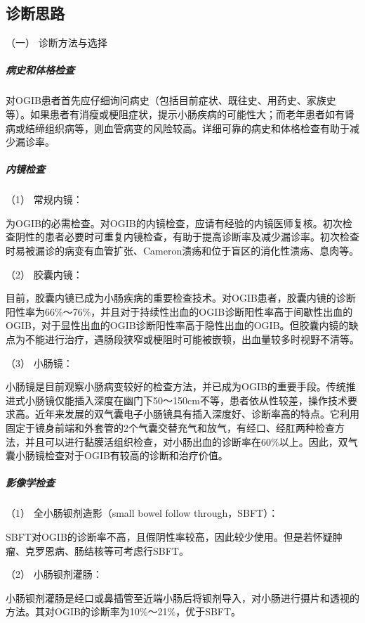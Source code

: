 \subsection{诊断思路}

\hypertarget{text00034.htmlux5cux23CHP1-13-3-1-1}{}
（一） 诊断方法与选择

\subparagraph{病史和体格检查}

对OGIB患者首先应仔细询问病史（包括目前症状、既往史、用药史、家族史等）。如果患者有消瘦或梗阻症状，提示小肠疾病的可能性大；而老年患者如有肾病或结缔组织病等，则血管病变的风险较高。详细可靠的病史和体格检查有助于减少漏诊率。

\subparagraph{内镜检查}

\hypertarget{text00034.htmlux5cux23CHP1-13-3-1-1-2-1}{}
（1） 常规内镜：

为OGIB的必需检查。对OGIB的内镜检查，应请有经验的内镜医师复核。初次检查阴性的患者必要时可重复内镜检查，有助于提高诊断率及减少漏诊率。初次检查时易被漏诊的病变有血管扩张、Cameron溃疡和位于盲区的消化性溃疡、息肉等。

\hypertarget{text00034.htmlux5cux23CHP1-13-3-1-1-2-2}{}
（2） 胶囊内镜：

目前，胶囊内镜已成为小肠疾病的重要检查技术。对OGIB患者，胶囊内镜的诊断阳性率为66\%～76\%，并且对于持续性出血的OGIB诊断阳性率高于间歇性出血的OGIB，对于显性出血的OGIB诊断阳性率高于隐性出血的OGIB。但胶囊内镜的缺点为不能进行治疗，遇肠段狭窄或梗阻时可能被嵌顿，出血量较多时视野不清等。

\hypertarget{text00034.htmlux5cux23CHP1-13-3-1-1-2-3}{}
（3） 小肠镜：

小肠镜是目前观察小肠病变较好的检查方法，并已成为OGIB的重要手段。传统推进式小肠镜仅能插入深度在幽门下50～150cm不等，患者依从性较差，操作技术要求高。近年来发展的双气囊电子小肠镜具有插入深度好、诊断率高的特点。它利用固定于镜身前端和外套管的2个气囊交替充气和放气，有经口、经肛两种检查方法，并且可以进行黏膜活组织检查，对小肠出血的诊断率在60\%以上。因此，双气囊小肠镜检查对于OGIB有较高的诊断和治疗价值。

\subparagraph{影像学检查}

\hypertarget{text00034.htmlux5cux23CHP1-13-3-1-1-3-1}{}
（1） 全小肠钡剂造影（small bowel follow through，SBFT）：

SBFT对OGIB的诊断率不高，且假阴性率较高，因此较少使用。但是若怀疑肿瘤、克罗恩病、肠结核等可考虑行SBFT。

\hypertarget{text00034.htmlux5cux23CHP1-13-3-1-1-3-2}{}
（2） 小肠钡剂灌肠：

小肠钡剂灌肠是经口或鼻插管至近端小肠后将钡剂导入，对小肠进行摄片和透视的方法。其对OGIB的诊断率为10\%～21\%，优于SBFT。

